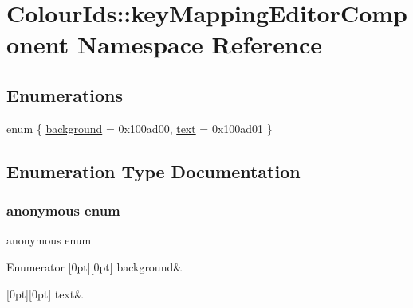 \hypertarget{namespaceColourIds_1_1keyMappingEditorComponent}{}\section{Colour\+Ids\+:\+:key\+Mapping\+Editor\+Component Namespace Reference}
\label{namespaceColourIds_1_1keyMappingEditorComponent}
\subsection*{Enumerations}
\begin{DoxyCompactItemize}
\item 
enum \{ \mbox{\hyperlink{namespaceColourIds_1_1keyMappingEditorComponent_aca440ff1bd1aa2c0a900e9807874a00fa2480abbed3796b826c8e134f88ce5f64}{background}} = 0x100ad00, 
\mbox{\hyperlink{namespaceColourIds_1_1keyMappingEditorComponent_aca440ff1bd1aa2c0a900e9807874a00fa360884dfd75180025bc9f2cb8103057a}{text}} = 0x100ad01
 \}
\end{DoxyCompactItemize}


\subsection{Enumeration Type Documentation}
\mbox{\label{namespaceColourIds_1_1keyMappingEditorComponent_aca440ff1bd1aa2c0a900e9807874a00f}} 
\subsubsection{\texorpdfstring{anonymous enum}{anonymous enum}}
{\footnotesize\ttfamily anonymous enum}

\begin{DoxyEnumFields}{Enumerator}
[0pt][0pt]{}\mbox{\label{namespaceColourIds_1_1keyMappingEditorComponent_aca440ff1bd1aa2c0a900e9807874a00fa2480abbed3796b826c8e134f88ce5f64}} 
background&\\
\hline

[0pt][0pt]{}\mbox{\label{namespaceColourIds_1_1keyMappingEditorComponent_aca440ff1bd1aa2c0a900e9807874a00fa360884dfd75180025bc9f2cb8103057a}} 
text&\\
\hline

\end{DoxyEnumFields}
